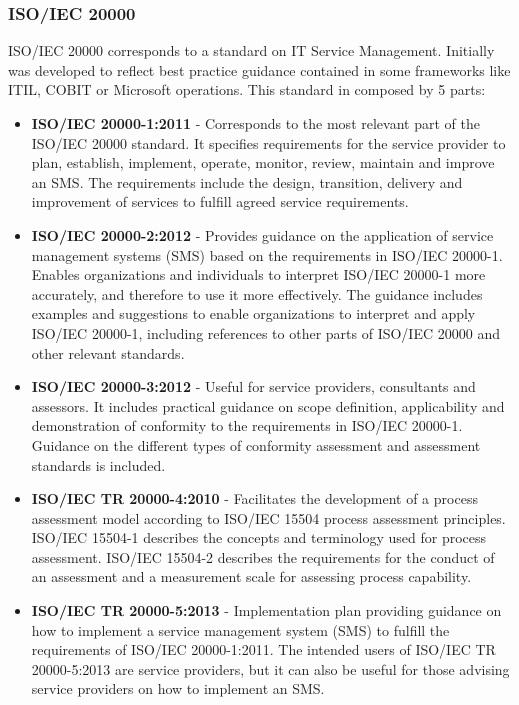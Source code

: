 \subsubsection{ISO/IEC 20000}

ISO/IEC 20000 corresponds to a standard on IT Service Management. Initially was developed to reflect best practice guidance contained in some frameworks like ITIL, COBIT or Microsoft operations. This standard in composed by 5 parts:

\begin{itemize}
  \item \textbf{ISO/IEC 20000-1:2011} -  Corresponds to the most relevant part of the ISO/IEC 20000 standard. It specifies requirements for the service provider to plan, establish, implement, operate, monitor, review, maintain and improve an SMS. The requirements include the design, transition, delivery and improvement of services to fulfill agreed service requirements.\par
  \vspace{5mm}
  \item \textbf{ISO/IEC 20000-2:2012} - Provides guidance on the application of service management systems (SMS) based on the requirements in ISO/IEC 20000-1. Enables organizations and individuals to interpret ISO/IEC 20000-1 more accurately, and therefore to use it more effectively. The guidance includes examples and suggestions to enable organizations to interpret and apply ISO/IEC 20000-1, including references to other parts of ISO/IEC 20000 and other relevant standards.\par
  \vspace{5mm}
  \item \textbf{ISO/IEC 20000-3:2012} - Useful for service providers, consultants and assessors. It includes practical guidance on scope definition, applicability and demonstration of conformity to the requirements in ISO/IEC 20000-1. Guidance on the different types of conformity assessment and assessment standards is included.\par
  \vspace{5mm}
  \item \textbf{ISO/IEC TR 20000-4:2010} - Facilitates the development of a process assessment model according to ISO/IEC 15504 process assessment principles. ISO/IEC 15504-1 describes the concepts and terminology used for process assessment. ISO/IEC 15504-2 describes the requirements for the conduct of an assessment and a measurement scale for assessing process capability.\par
  \vspace{5mm}
  \item \textbf{ISO/IEC TR 20000-5:2013} - Implementation plan providing guidance on how to implement a service management system (SMS) to fulfill the requirements of ISO/IEC 20000-1:2011. The intended users of ISO/IEC TR 20000-5:2013 are service providers, but it can also be useful for those advising service providers on how to implement an SMS.\par
  \vspace{5mm}


\end{itemize}
